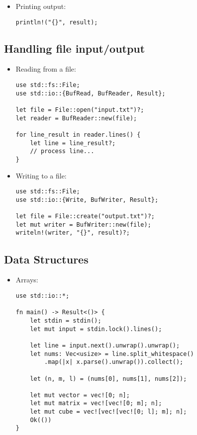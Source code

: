 \documentclass[letterpaper,landscape]{article}
\begin{document}
\begin{multicols*}{3}
\begin{itemize}
\item Printing output:
\begin{verbatim}
println!("{}", result);
\end{verbatim}
\end{itemize}

\subsection*{Handling file input/output}
\begin{itemize}
\item Reading from a file:
\begin{verbatim}
use std::fs::File;
use std::io::{BufRead, BufReader, Result};

let file = File::open("input.txt")?;
let reader = BufReader::new(file);

for line_result in reader.lines() {
    let line = line_result?; 
    // process line...
}
\end{verbatim}

\item Writing to a file:
\begin{verbatim}
use std::fs::File;
use std::io::{Write, BufWriter, Result};

let file = File::create("output.txt")?;
let mut writer = BufWriter::new(file);
writeln!(writer, "{}", result)?;
\end{verbatim}
\end{itemize}


\subsection*{Data Structures}

\begin{itemize}
\item Arrays:
\begin{verbatim}
use std::io::*;

fn main() -> Result<()> {
    let stdin = stdin();
    let mut input = stdin.lock().lines();
    
    let line = input.next().unwrap().unwrap();
    let nums: Vec<usize> = line.split_whitespace()
        .map(|x| x.parse().unwrap()).collect();
    
    let (n, m, l) = (nums[0], nums[1], nums[2]);

    let mut vector = vec![0; n];
    let mut matrix = vec![vec![0; m]; n];
    let mut cube = vec![vec![vec![0; l]; m]; n];
    Ok(())
}
\end{verbatim}


\end{itemize}
\end{multicols*}
\end{document}
